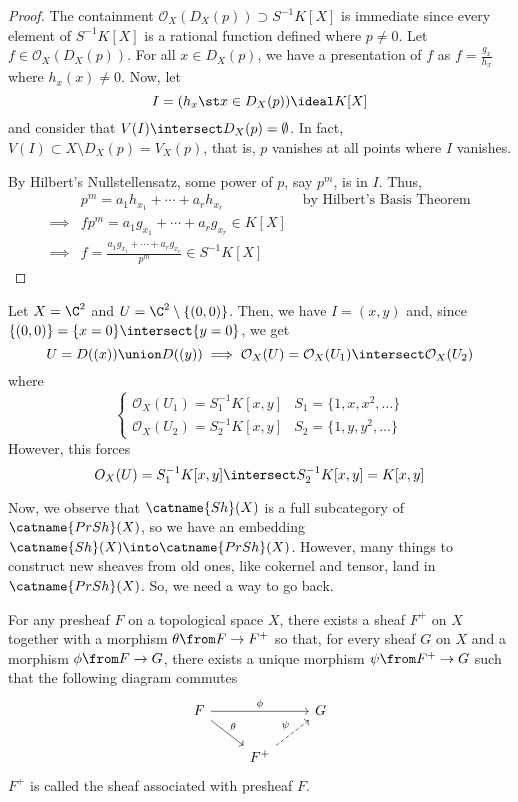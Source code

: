 \documentclass[11pt,leqno,oneside]{amsbook}
\renewcommand{\F}{F} %
\newcommand{\G}{G}
\renewcommand{\O}{\mathcal{O}}
\numberwithin{thm}{section}
\begin{document}
\begin{proof}
  The containment \(\O_X(D_X(p)) \supset S^{-1}K[X]\) is immediate
  since every element of \(S^{-1}K[X]\) is a rational function defined
  where \(p \neq 0\). Let \(f \in \O_X(D_X(p))\). For all \(x \in
  D_X(p)\), we have a presentation of \(f\) as \(f = \frac{g_x}{h_x}\)
  where \(h_x(x) \neq 0\). Now, let \[
    I = (h_x \st x \in D_X(p)) \ideal K[X]
  \]
  and consider that \(V(I) \intersect D_X(p) = \emptyset\). In fact,
  \(V(I) \subset X \setminus D_X(p) = V_X(p)\), that is, \(p\)
  vanishes at all points where \(I\) vanishes.

  By Hilbert's Nullstellensatz, some power of \(p\), say \(p^m\), is
  in \(I\). Thus,
  \begin{align*}
    & p^m = a_1 h_{x_1} + \cdots + a_r h_{x_r} & \text{ by Hilbert's
                                                 Basis Theorem} \\
    \implies & fp^m = a_1 g_{x_1} + \cdots + a_r g_{x_r} \in K[X] \\
    \implies & f = \frac{a_1 g_{x_1} + \cdots + a_r g_{x_r}}{p^m} \in S^{-1}K[X]
  \end{align*}
\end{proof}
\begin{example}
  Let \(X = \C^2\) and \(U = \C^2 \setminus \{(0,0)\}\). Then, we have
  \(I = (x,y)\) and, since \(\{(0,0)\} = \{x=0\} \intersect \{y=0\}\),
  we get \[
    U = D((x)) \union D((y)) \implies \O_X(U) = \O_X(U_1) \intersect \O_X(U_2)
  \]
  where \[
    \begin{cases}
      \O_X(U_1) = S_1^{-1}K[x,y] & S_1 = \{1,x,x^2,\ldots\} \\
      \O_X(U_2) = S_2^{-1}K[x,y] & S_2 = \{1,y,y^2,\ldots\}
    \end{cases}
  \]
  However, this forces \[
    O_X(U) = S_1^{-1}K[x,y] \intersect S_2^{-1}K[x,y] = K[x,y]
  \]
\end{example}
Now, we observe that \(\catname{Sh}(X)\) is a full subcategory of
\(\catname{PrSh}(X)\), so we have an embedding \(\catname{Sh}(X) \into
\catname{PrSh}(X)\). However, many things to construct new sheaves
from old ones, like cokernel and tensor, land in
\(\catname{PrSh}(X)\). So, we need a way to go back.
\begin{thm}
  For any presheaf \(\F\) on a topological space \(X\), there exists a
  sheaf \(\F^+\) on \(X\) together with a morphism \(\theta \from \F
  \to \F^+\) so that, for every sheaf \(\G\) on \(X\) and a morphism
  \(\phi \from \F \to G\), there exists a unique morphism \(\psi \from
  \F^+ \to G\) such that the following diagram commutes \[
    \begin{tikzcd}
      \F \ar[rd, "\theta"] \ar[rr,"\phi"] & & \G \\
      & \F^+ \ar[ru, dashed, "\psi"]
    \end{tikzcd}
  \]
  \(\F^+\) is called the sheaf associated with presheaf \(\F\).
\end{thm}
\end{document}
